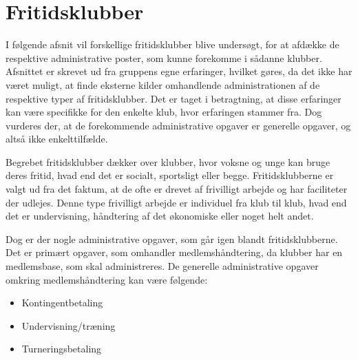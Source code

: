 \chapter{Fritidsklubber} \label{chap:Fritidsklubber}

I følgende afsnit vil forskellige fritidsklubber blive undersøgt, for at afdække de respektive administrative poster, som kunne forekomme i sådanne klubber. 
Afsnittet er skrevet ud fra gruppens egne erfaringer, hvilket gøres, da det ikke har været muligt, at finde eksterne kilder omhandlende administrationen af de respektive typer af fritidsklubber.  
Det er taget i betragtning, at disse erfaringer kan være specifikke for den enkelte klub, hvor erfaringen stammer fra. 
Dog vurderes der, at de forekommende administrative opgaver er generelle opgaver, og altså ikke enkelttilfælde.

Begrebet fritidsklubber dækker over klubber, hvor voksne og unge kan bruge deres fritid, hvad end det er socialt, sportsligt eller begge. 
Fritidsklubberne er valgt ud fra det faktum, at de ofte er drevet af frivilligt arbejde og har faciliteter der udlejes. 
Denne type frivilligt arbejde er individuel fra klub til klub, hvad end det er undervisning, håndtering af det økonomiske eller noget helt andet. 

Dog er der nogle administrative opgaver, som går igen blandt fritidsklubberne.
Det er primært opgaver, som omhandler medlemshåndtering, da klubber har en medlemsbase, som skal administreres. 
De generelle administrative opgaver omkring medlemshåndtering kan være følgende:
\begin{itemize}
	\item Kontingentbetaling
	\item Undervisning/træning
	\item Turneringsbetaling
\end{itemize}



